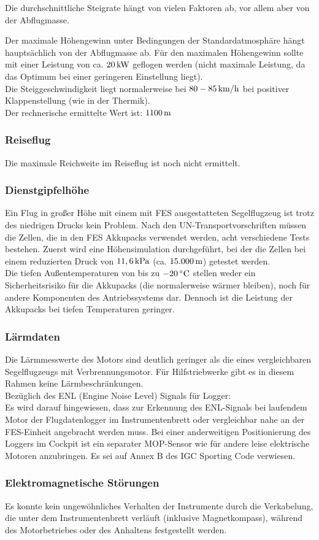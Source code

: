 Die durchschnittliche Steigrate hängt von vielen Faktoren ab, vor allem aber von der Abflugmasse.

Der maximale Höhengewinn unter Bedingungen der Standardatmosphäre hängt hauptsächlich von der Abflugmasse ab. Für den maximalen Höhengewinn sollte mit einer Leistung von ca. $\unit[20]{kW}$ geflogen werden (nicht maximale Leistung, da das Optimum bei einer geringeren Einstellung liegt).\\ 
Die Steiggeschwindigkeit liegt normalerweise bei $\unit[80-85]{km/h}$ bei positiver Klappenstellung (wie in der Thermik).\\
Der rechnerische ermittelte Wert ist: $\unit[1100]{m}$ 

\subsubsection{Reiseflug}
Die maximale Reichweite im Reiseflug ist noch nicht ermittelt. 

\subsubsection{Dienstgipfelhöhe}
Ein Flug in großer Höhe mit einem mit FES ausgestatteten Segelflugzeug ist trotz des niedrigen Drucks kein Problem. Nach den UN-Transportvorschriften müssen die Zellen, die in den FES Akkupacks verwendet werden, acht verschiedene Tests bestehen. Zuerst wird eine Höhensimulation durchgeführt, bei der die Zellen bei einem reduzierten Druck von $\unit[11,6]{kPa}$ (ca. $\unit[15.000]{m}$) getestet werden.\\

Die tiefen Außentemperaturen von bis zu $\unit[-20]{^\circ C}$ stellen weder ein Sicherheitsrisiko für
die Akkupacks (die normalerweise wärmer bleiben), noch für andere Komponenten des Antriebssystems dar. Dennoch ist die Leistung der Akkupacks bei tiefen Temperaturen geringer.

\subsubsection{Lärmdaten} 
Die Lärmmesswerte des Motors sind deutlich geringer als die eines vergleichbaren Segelflugzeugs mit Verbrennungsmotor.
Für Hilfstriebwerke gibt es in diesem Rahmen keine Lärmbeschränkungen.\\

Bezüglich des ENL (Engine Noise Level) Signals für Logger:\\
Es wird darauf hingewiesen, dass zur Erkennung des ENL-Signals bei laufendem Motor der Flugdatenlogger im Instrumentenbrett oder vergleichbar nahe an der FES-Einheit angebracht werden muss. Bei einer anderweitigen Positionierung des Loggers im
Cockpit ist ein separater MOP-Sensor wie für andere leise elektrische Motoren anzubringen.
Es sei auf Annex B des IGC Sporting Code verwiesen.

\subsubsection{Elektromagnetische Störungen}
Es konnte kein ungewöhnliches Verhalten der Instrumente durch die Verkabelung, die unter dem Instrumentenbrett verläuft (inklusive Magnetkompass), während des Motorbetriebes oder des Anhaltens festgestellt werden.



